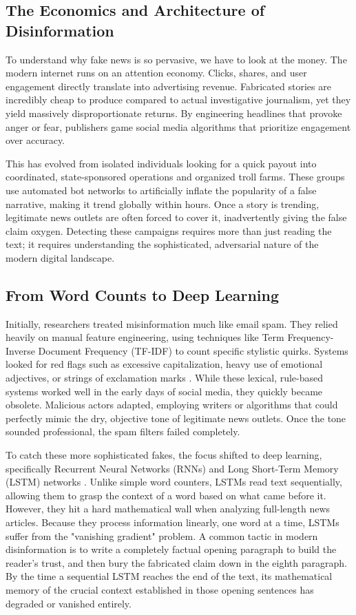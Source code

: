 \documentclass[conference]{IEEEtran}
\begin{document}
\subsection{The Economics and Architecture of Disinformation}
To understand why fake news is so pervasive, we have to look at the money. The modern internet runs on an attention economy. Clicks, shares, and user engagement directly translate into advertising revenue. Fabricated stories are incredibly cheap to produce compared to actual investigative journalism, yet they yield massively disproportionate returns. By engineering headlines that provoke anger or fear, publishers game social media algorithms that prioritize engagement over accuracy. 

This has evolved from isolated individuals looking for a quick payout into coordinated, state-sponsored operations and organized troll farms. These groups use automated bot networks to artificially inflate the popularity of a false narrative, making it trend globally within hours. Once a story is trending, legitimate news outlets are often forced to cover it, inadvertently giving the false claim oxygen. Detecting these campaigns requires more than just reading the text; it requires understanding the sophisticated, adversarial nature of the modern digital landscape.

\subsection{From Word Counts to Deep Learning}
Initially, researchers treated misinformation much like email spam. They relied heavily on manual feature engineering, using techniques like Term Frequency-Inverse Document Frequency (TF-IDF) to count specific stylistic quirks. Systems looked for red flags such as excessive capitalization, heavy use of emotional adjectives, or strings of exclamation marks \cite{b5}. While these lexical, rule-based systems worked well in the early days of social media, they quickly became obsolete. Malicious actors adapted, employing writers or algorithms that could perfectly mimic the dry, objective tone of legitimate news outlets. Once the tone sounded professional, the spam filters failed completely.

To catch these more sophisticated fakes, the focus shifted to deep learning, specifically Recurrent Neural Networks (RNNs) and Long Short-Term Memory (LSTM) networks \cite{b10}. Unlike simple word counters, LSTMs read text sequentially, allowing them to grasp the context of a word based on what came before it. However, they hit a hard mathematical wall when analyzing full-length news articles. Because they process information linearly, one word at a time, LSTMs suffer from the "vanishing gradient" problem. A common tactic in modern disinformation is to write a completely factual opening paragraph to build the reader's trust, and then bury the fabricated claim down in the eighth paragraph. By the time a sequential LSTM reaches the end of the text, its mathematical memory of the crucial context established in those opening sentences has degraded or vanished entirely.
\end{document}
